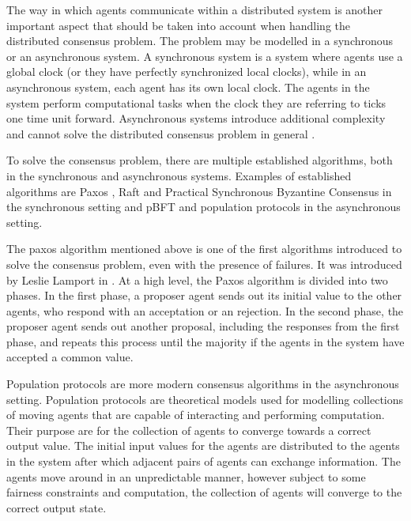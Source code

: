 The way in which agents communicate within a distributed system is another important aspect that should be taken into account when handling the distributed consensus problem. The problem may be modelled in a synchronous or an asynchronous system. A synchronous system is a system where agents use a global clock (or they have perfectly synchronized local clocks), while in an asynchronous system, each agent has its own local clock. The agents in the system perform computational tasks when the clock they are referring to ticks one time unit forward. Asynchronous systems introduce additional complexity and cannot solve the distributed consensus problem in general \cite{fischerImpossibilityDistributedConsensus}.

To solve the consensus problem, there are multiple established algorithms, both in the synchronous and asynchronous systems. Examples of established algorithms are Paxos \cite{lamportFastPaxos2006}, Raft \cite{ongaroSearchUnderstandableConsensus} and Practical Synchronous Byzantine Consensus \cite{renPracticalSynchronousByzantine} in the synchronous setting and pBFT \cite{castroPracticalByzantineFault} and population protocols \cite{aspnesIntroductionPopulationProtocols2009} in the asynchronous setting.

The paxos algorithm mentioned above is one of the first algorithms introduced to solve the consensus problem, even with the presence of failures. It was introduced by Leslie Lamport  in \cite{lamportPartTimeParliment1998}. At a high level, the Paxos algorithm is divided into two phases. In the first phase, a proposer agent sends out its initial value to the other agents, who respond with an acceptation or an rejection. In the second phase, the proposer agent sends out another proposal, including the responses from the first phase, and repeats this process until the majority if the agents in the system have accepted a common value. 

Population protocols are more modern consensus algorithms in the asynchronous setting. Population protocols are theoretical models used for modelling collections of moving agents that are capable of interacting and performing computation. Their purpose are for the collection of agents to converge towards a correct output value. The initial input values for the agents are distributed to the agents in the system after which adjacent pairs of agents can exchange information. The agents move around in an unpredictable manner, however subject to some fairness constraints and computation, the collection of agents will converge to the correct output state. \cite{aspnesIntroductionPopulationProtocols2009} 

